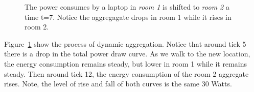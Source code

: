 \begin{figure}[htb!]
\begin{center}
\end{center}
\caption{
	The power consumes by a laptop in \emph{room 1} is shifted to \emph{room 2} a time t=7.  Notice the aggregagate drops in room 1
	while it rises in room 2.
     }%
\label{fig:multiroomagg}
\end{figure}

Figure~\ref{fig:multiroomagg} show the process of dynamic aggregation.  Notice that around tick 5 there is a drop in the total power
draw curve.  As we walk to the new location, the energy consumption remains steady, but lower in room 1 while it remains steady.
Then around tick 12, the energy consumption of the room 2 aggregate rises.  Note, the level of rise and fall of both curves is the same
30 Watts.



